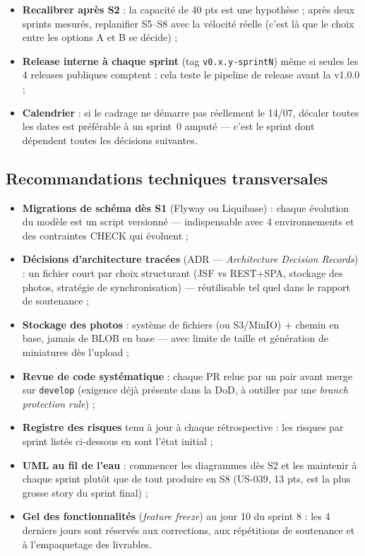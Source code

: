 \begin{itemize}
  \item \textbf{Recalibrer après S2} : la capacité de 40 pts est une
        hypothèse ; après deux sprints mesurés, replanifier S5--S8 avec la
        vélocité réelle (c'est là que le choix entre les options A et B se
        décide) ;
  \item \textbf{Release interne à chaque sprint} (tag
        \texttt{v0.x.y-sprintN}) même si seules les 4 releases publiques
        comptent : cela teste le pipeline de release avant la v1.0.0 ;
  \item \textbf{Calendrier} : si le cadrage ne démarre pas réellement le
        14/07, décaler toutes les dates est préférable à un sprint~0 amputé ---
        c'est le sprint dont dépendent toutes les décisions suivantes.
\end{itemize}

\subsection{Recommandations techniques transversales}
\label{sec:reco-transversales}

\begin{itemize}
  \item \textbf{Migrations de schéma dès S1} (Flyway ou Liquibase) : chaque
        évolution du modèle est un script versionné --- indispensable avec
        4 environnements et des contraintes CHECK qui évoluent ;
  \item \textbf{Décisions d'architecture tracées} (ADR --- \emph{Architecture
        Decision Records}) : un fichier court par choix structurant
        (JSF vs REST+SPA, stockage des photos, stratégie de synchronisation)
        --- réutilisable tel quel dans le rapport de soutenance ;
  \item \textbf{Stockage des photos} : système de fichiers (ou S3/MinIO) +
        chemin en base, jamais de BLOB en base --- avec limite de taille et
        génération de miniatures dès l'upload ;
  \item \textbf{Revue de code systématique} : chaque PR relue par un pair
        avant merge sur \texttt{develop} (exigence déjà présente dans la
        DoD, à outiller par une \emph{branch protection rule}) ;
  \item \textbf{Registre des risques} tenu à jour à chaque rétrospective :
        les risques par sprint listés ci-dessous en sont l'état initial ;
  \item \textbf{UML au fil de l'eau} : commencer les diagrammes dès S2 et
        les maintenir à chaque sprint plutôt que de tout produire en S8
        (US-039, 13 pts, est la plus grosse story du sprint final) ;
  \item \textbf{Gel des fonctionnalités} (\emph{feature freeze}) au jour 10
        du sprint 8 : les 4 derniers jours sont réservés aux corrections,
        aux répétitions de soutenance et à l'empaquetage des livrables.
\end{itemize}

